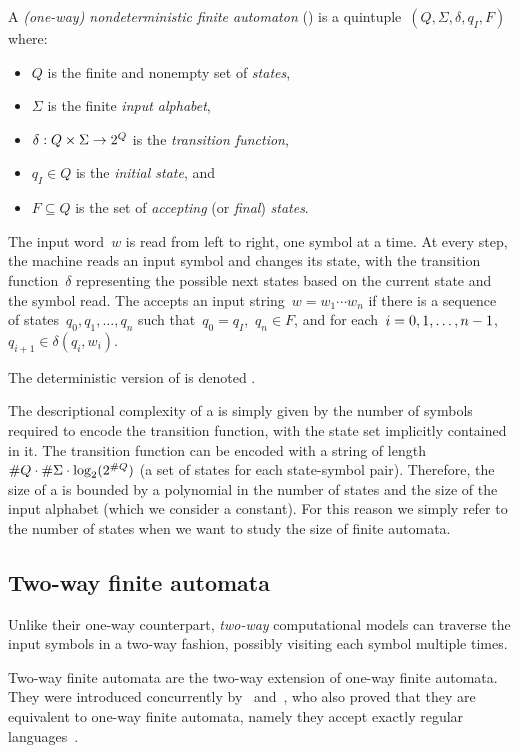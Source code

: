 \begin{defn}
	A \emph{(one-way) nondeterministic finite automaton} (\ONFA) is a quintuple~$(Q,\Sigma,\delta,q_I,F)$ where:
	\begin{itemize}
		\item $Q$ is the finite and nonempty set of \emph{states},
		\item $\Sigma$ is the finite \emph{input alphabet},
		\item $\delta:Q\times\Sigma\to2^{Q}$ is the \emph{transition function},
		\item $q_I\in Q$ is the \emph{initial state}, and
		\item $F\subseteq Q$ is the set of \emph{accepting} (or \emph{final}) \emph{states}.
	\end{itemize}
	The input word~$w$ is read from left to right, one symbol at a time.
	At every step, the machine reads an input symbol and changes its state, with the transition function~$\delta$ representing the possible next states based on the current state and the symbol read.
	The \ONFA accepts an input string~$w=w_1\cdots w_n$ if there is a sequence of states~$q_0,q_1,\dots,q_n$ such that~$q_0=q_I$,~$q_n\in F$, and for each~$i=0,1,\dots,n-1$,~$q_{i+1}\in\delta(q_i,w_i)$.

	\noindent The deterministic version of \ONFAs is denoted \ODFAs.
\end{defn}

The descriptional complexity of a \ONFA is simply given by the number of symbols required to encode the transition function, with the state set implicitly contained in it.
The transition function can be encoded with a string of length~$\# Q\cdot\# \Sigma\cdot\log_2(2^{\# Q})$ (a set of states for each state-symbol pair).
Therefore, the size of a \ONFA is bounded by a polynomial in the number of states and the size of the input alphabet (which we consider a constant).
For this reason we simply refer to the number of states when we want to study the size of finite automata.


\subsection{Two-way finite automata}
Unlike their one-way counterpart, \emph{two-way} computational models can traverse the input symbols in a two-way fashion, possibly visiting each symbol multiple times.

Two-way finite automata are the two-way extension of one-way finite automata.
They were introduced concurrently by~\citeauthor{RabSco59} and~\citeauthor{She59}, who also proved that they are equivalent to one-way finite automata, namely they accept exactly regular languages~\cite{RabSco59,She59}.

